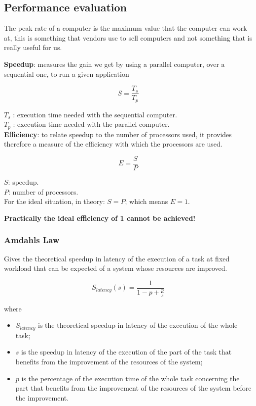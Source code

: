 \subsection{Performance evaluation}
The peak rate of a computer is the maximum value that the computer can work at, this is something that vendors use to sell computers and not something that is really useful for us.

\textbf{Speedup}: measures the gain we get by using a parallel computer, over a sequential one, to run a given application

$$S = \frac{T_s}{T_p}$$

$T_s$ : execution time needed with the sequential computer. \\
$T_p$ : execution time needed with the parallel computer. \\

\textbf{Efficiency}: to relate speedup to the number of processors used, it provides therefore a measure of the efficiency with which the processors are used.

$$E = \frac{S}{P}$$

$S$: speedup. \\
$P$: number of processors. \\
For the ideal situation, in theory: $S = P$; which means $E = 1$.

\textbf{Practically the ideal efficiency of 1 cannot be achieved!}

\subsubsection{Amdahls Law}
Gives the theoretical speedup in latency of the execution of a task at fixed workload that can be expected of a system whose resources are improved.

$$S_{latency}(s)=\frac{1}{1-p+\frac{p}{s}}$$

where
\begin{itemize}
\item $S_{latency}$ is the theoretical speedup in latency of the execution of the whole task;
\item $s$ is the speedup in latency of the execution of the part of the task that benefits from the improvement of the resources of the system;
\item $p$ is the percentage of the execution time of the whole task concerning the part that benefits from the improvement of the resources of the system before the improvement.
  \newline
\end{itemize}

